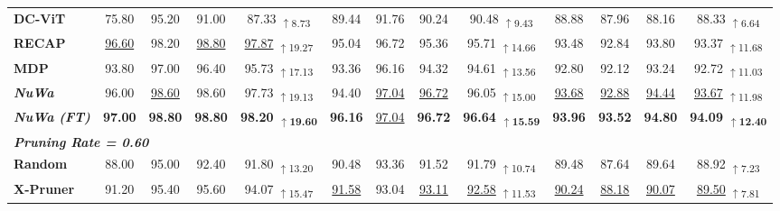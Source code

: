 \begin{table}[t]
\begin{scriptsize}
\begin{tabular}{l||ccc|c||ccc|c||ccc|c}
\textbf{DC-ViT} & 75.80 & 95.20 & 91.00 & 87.33 \textsubscript{\textcolor{upred}{$\uparrow$8.73}} & 89.44 & 91.76 & 90.24 & 90.48 \textsubscript{\textcolor{upred}{$\uparrow$9.43}} & 88.88 & 87.96 & 88.16 & 88.33 \textsubscript{\textcolor{upred}{$\uparrow$6.64}}\\
\rowcolor[gray]{0.95}
\textbf{RECAP} & \underline{96.60} & 98.20 & \underline{98.80} & \underline{97.87} \textsubscript{\textcolor{upred}{$\uparrow$19.27}} & 95.04 & 96.72 & 95.36 & 95.71 \textsubscript{\textcolor{upred}{$\uparrow$14.66}} & 93.48 & 92.84 & 93.80 & 93.37 \textsubscript{\textcolor{upred}{$\uparrow$11.68}}\\
\textbf{MDP} & 93.80 & 97.00 & 96.40 & 95.73 \textsubscript{\textcolor{upred}{$\uparrow$17.13}} & 93.36 & 96.16 & 94.32 & 94.61 \textsubscript{\textcolor{upred}{$\uparrow$13.56}} & 92.80 & 92.12 & 93.24 & 92.72 \textsubscript{\textcolor{upred}{$\uparrow$11.03}}\\
\hline\rowcolor[HTML]{FFF2E0}
\textbf{\textit{NuWa}} & 96.00 & \underline{98.60} & 98.60 & 97.73 \textsubscript{\textcolor{upred}{$\uparrow$19.13}} & 94.40 & \underline{97.04} & \underline{96.72} & 96.05 \textsubscript{\textcolor{upred}{$\uparrow$15.00}} & \underline{93.68} & \underline{92.88} & \underline{94.44} & \underline{93.67} \textsubscript{\textcolor{upred}{$\uparrow$11.98}}\\
\rowcolor[HTML]{FFF6E2}
\textbf{\textit{NuWa (FT)}} & \textbf{97.00} & \textbf{98.80} & \textbf{98.80} & \textbf{98.20 \textsubscript{\textcolor{upred}{$\uparrow$19.60}}} & \textbf{96.16} & \underline{97.04} & \textbf{96.72} & \textbf{96.64 \textsubscript{\textcolor{upred}{$\uparrow$15.59}}} & \textbf{93.96} & \textbf{93.52} & \textbf{94.80} & \textbf{94.09 \textsubscript{\textcolor{upred}{$\uparrow$12.40}}}\\
\hline\hline
\multicolumn{13}{l}{\textit{\textcolor{gray!70}{\textbf{Pruning Rate = 0.60}}}}\\
\textbf{Random} & 88.00 & 95.00 & 92.40 & 91.80 \textsubscript{\textcolor{upred}{$\uparrow$13.20}} & 90.48 & 93.36 & 91.52 & 91.79 \textsubscript{\textcolor{upred}{$\uparrow$10.74}} & 89.48 & 87.64 & 89.64 & 88.92 \textsubscript{\textcolor{upred}{$\uparrow$7.23}}\\
\rowcolor[gray]{0.95}
\textbf{X-Pruner} & 91.20 & 95.40 & 95.60 & 94.07 \textsubscript{\textcolor{upred}{$\uparrow$15.47}} & \underline{91.58} & 93.04 & \underline{93.11} & \underline{92.58} \textsubscript{\textcolor{upred}{$\uparrow$11.53}} & \underline{90.24} & \underline{88.18} & \underline{90.07} & \underline{89.50} \textsubscript{\textcolor{upred}{$\uparrow$7.81}}\\

\end{tabular}
\end{scriptsize}
\end{table}

